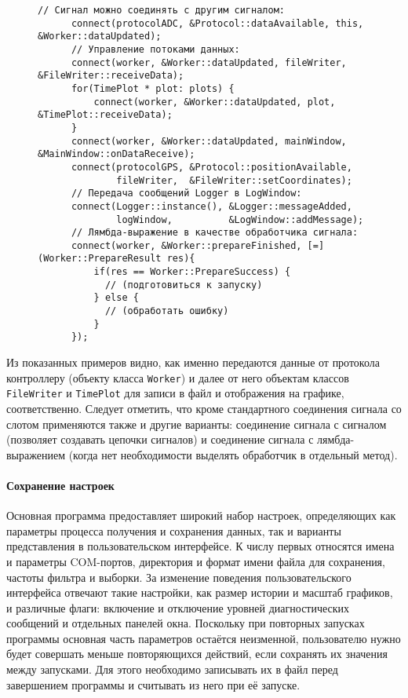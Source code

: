 \documentclass[a4paper, 14pt, titlepage]{extarticle}
\newcommand{\inlinecode}[1]{\lstinline[basicstyle=\ttfamily]{#1}}
\newenvironment{myfigure}[2]%
    {\pushQED{\caption{#1} \label{#2}} %
     \begin{figure}[!htb]\centering } %
    {  \popQED %
     \end{figure}}
\begin{document}
  \begin{myfigure}{Примеры соединения сигналов и слотов}{fig:src-signals-slots}
    \begin{lstlisting}[xleftmargin=0pt, xrightmargin=0pt, basicstyle=\footnotesize]
      // Сигнал можно соединять с другим сигналом:
      connect(protocolADC, &Protocol::dataAvailable, this, &Worker::dataUpdated);
      // Управление потоками данных:
      connect(worker, &Worker::dataUpdated, fileWriter, &FileWriter::receiveData);
      for(TimePlot * plot: plots) {
          connect(worker, &Worker::dataUpdated, plot, &TimePlot::receiveData);
      }
      connect(worker, &Worker::dataUpdated, mainWindow, &MainWindow::onDataReceive);
      connect(protocolGPS, &Protocol::positionAvailable,
              fileWriter,  &FileWriter::setCoordinates);
      // Передача сообщений Logger в LogWindow:
      connect(Logger::instance(), &Logger::messageAdded,
              logWindow,          &LogWindow::addMessage);
      // Лямбда-выражение в качестве обработчика сигнала:
      connect(worker, &Worker::prepareFinished, [=](Worker::PrepareResult res){
          if(res == Worker::PrepareSuccess) {
            // (подготовиться к запуску)
          } else {
            // (обработать ошибку)
          }
      });
    \end{lstlisting}
  \end{myfigure}

  Из показанных примеров видно, как именно передаются данные от протокола контроллеру (объекту
  класса \inlinecode{Worker}) и далее от него объектам классов \inlinecode{FileWriter} и
  \inlinecode{TimePlot} для записи в файл и отображения на графике, соответственно.
  Следует отметить, что кроме стандартного соединения сигнала со слотом применяются также и другие
  варианты: соединение сигнала с сигналом (позволяет создавать цепочки сигналов) и соединение
  сигнала с лямбда-выражением (когда нет необходимости выделять обработчик в отдельный метод).

  \paragraph{Сохранение настроек}
  Основная программа предоставляет широкий набор настроек, определяющих как параметры процесса
  получения и сохранения данных, так и варианты представления в пользовательском интерфейсе. К числу
  первых относятся имена и параметры COM-портов, директория и формат имени файла для сохранения,
  частоты фильтра и выборки. За изменение поведения пользовательского интерфейса отвечают такие
  настройки, как размер истории и масштаб графиков, и различные флаги: включение и отключение
  уровней диагностических сообщений и отдельных панелей окна. Поскольку при повторных запусках
  программы основная часть параметров остаётся неизменной, пользователю нужно будет совершать меньше
  повторяющихся действий, если сохранять их значения между запусками. Для этого необходимо
  записывать их в файл перед завершением программы и считывать из него при её запуске.
\end{document}
